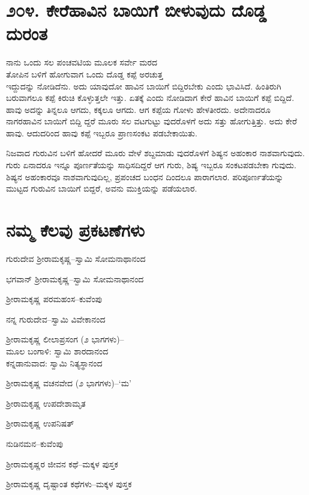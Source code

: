 \section{\num{೨೦೪. } ಕೇರೆಹಾವಿನ ಬಾಯಿಗೆ ಬೀಳುವುದು ದೊಡ್ಡ ದುರಂತ}

ನಾನು ಒಂದು ಸಲ ಪಂಚವಟಿಯ ಮೂಲಕ ಸರ್ವೇ ಮರದ\\ತೋಪಿನ ಬಳಿಗೆ ಹೋಗುವಾಗ ಒಂದು ದೊಡ್ಡ ಕಪ್ಪೆ ಅರಚುತ್ತ\\ಇದ್ದುದನ್ನು ನೋಡಿದೆನು. ಅದು ಯಾವುದೋ ಹಾವಿನ ಬಾಯಿಗೆ ಬಿದ್ದಿರಬೇಕು ಎಂದು ಭಾವಿಸಿದೆ. ಹಿಂತಿರುಗಿ ಬರುವಾಗಲೂ ಕಪ್ಪೆ ಕಿರುಚಿ ಕೊಳ್ಳುತ್ತಲೇ ಇತ್ತು. ಏತಕ್ಕೆ ಎಂದು ನೋಡಿದಾಗ ಕೇರೆ ಹಾವಿನ ಬಾಯಿಗೆ ಕಪ್ಪೆ ಬಿದ್ದಿದೆ. ಹಾವು ಅದನ್ನು ತಿನ್ನಲೂ ಆಗದು, ಕಕ್ಕಲೂ ಆಗದು. ಆಗ ಕಪ್ಪೆಯ ಗೋಳು ಹೇಳತೀರದು. ಅದೇನಾದರೂ ನಾಗರಹಾವಿನ ಬಾಯಿಗೆ ಬಿದ್ದಿ ದ್ದರೆ ಮೂರು ಸಲ ವಟಗುಟ್ಟು ವುದರೊಳಗೆ ಅದು ಸತ್ತು ಹೋಗುತ್ತಿತ್ತು. ಅದು ಕೇರೆ ಹಾವು. ಆದುದರಿಂದ ಹಾವು ಕಪ್ಪೆ ಇಬ್ಬರೂ ಪ್ರಾಣಸಂಕಟ ಪಡಬೇಕಾಯಿತು.

ನಿಜವಾದ ಗುರುವಿನ ಬಳಿಗೆ ಹೋದರೆ ಮೂರು ವೇಳೆ ಶಬ್ದಮಾಡು ವುದರೊಳಗೆ ಶಿಷ್ಯನ ಅಹಂಕಾರ ನಾಶವಾಗುವುದು. ಗುರು ಏನಾದರೂ ಇನ್ನೂ ಪೂರ್ಣತೆಯನ್ನು ಸಾಧಿಸದಿದ್ದರೆ ಆಗ ಗುರು, ಶಿಷ್ಯ ಇಬ್ಬರೂ ಸಂಕಟಪಡಬೇಕಾ ಗುವುದು. ಶಿಷ್ಯನ ಅಹಂಕಾರವೂ ನಾಶವಾಗುವುದಿಲ್ಲ, ಪ್ರಪಂಚದ ಬಂಧನ ದಿಂದಲೂ ಪಾರಾಗಲಾರ. ಪರಿಪೂರ್ಣತೆಯನ್ನು ಮುಟ್ಟದ ಗುರುವಿನ ಬಾಯಿಗೆ ಬಿದ್ದರೆ, ಅವನು ಮುಕ್ತಿಯನ್ನು ಪಡೆಯಲಾರ.


\section{ನಮ್ಮ ಕೆಲವು ಪ್ರಕಟಣೆಗಳು}

ಗುರುದೇವ ಶ್ರೀರಾಮಕೃಷ್ಣ–ಸ್ವಾಮಿ ಸೋಮನಾಥಾನಂದ

ಭಗವಾನ್ ಶ್ರೀರಾಮಕೃಷ್ಣ–ಸ್ವಾಮಿ ಸೋಮನಾಥಾನಂದ

ಶ್ರೀರಾಮಕೃಷ್ಣ ಪರಮಹಂಸ–ಕುವೆಂಪು

ನನ್ನ ಗುರುದೇವ–ಸ್ವಾಮಿ ವಿವೇಕಾನಂದ

ಶ್ರೀರಾಮಕೃಷ್ಣ ಲೀಲಾಪ್ರಸಂಗ (೨ ಭಾಗಗಳು)–\\ಮೂಲ ಬಂಗಾಳಿ: ಸ್ವಾಮಿ ಶಾರದಾನಂದ \\ಕನ್ನಡಾನುವಾದ: ಸ್ವಾಮಿ ನಿತ್ಯಸ್ಥಾನಂದ

ಶ್ರೀರಾಮಕೃಷ್ಣ ವಚನವೇದ (೨ ಭಾಗಗಳು)–‘ಮ’

ಶ್ರೀರಾಮಕೃಷ್ಣ ಉಪದೇಶಾಮೃತ

ಶ್ರೀರಾಮಕೃಷ್ಣ ಉಪನಿಷತ್​

ನುಡಿನಮನ–ಕುವೆಂಪು

ಶ್ರೀರಾಮಕೃಷ್ಣರ ಜೀವನ ಕಥೆ–ಮಕ್ಕಳ ಪುಸ್ತಕ

ಶ್ರೀರಾಮಕೃಷ್ಣ ದೃಷ್ಟಾಂತ ಕಥೆಗಳು–ಮಕ್ಕಳ ಪುಸ್ತಕ

